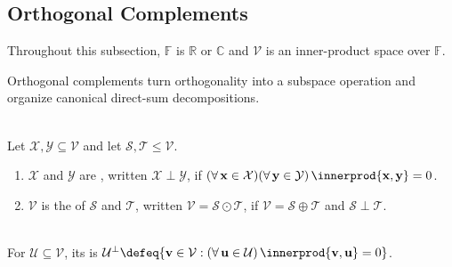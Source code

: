 \subsection{Orthogonal Complements}

%

Throughout this subsection, $\mathbb{F}$ is $\mathbb{R}$ or $\mathbb{C}$ and $\mathcal{V}$ is an inner-product space over $\mathbb{F}$.

Orthogonal complements turn orthogonality into a subspace operation and organize canonical direct-sum decompositions.

\begin{definition} \label{def:orthogonal-subsets-and-direct-sums} \\
Let $\mathcal{X},\mathcal{Y}\subseteq\mathcal{V}$ and let $\mathcal{S},\mathcal{T}\leq\mathcal{V}$.
\begin{enumerate}[label=(\roman*)]
\setlength{\itemsep}{0pt}
\item $\mathcal{X}$ and $\mathcal{Y}$ are , written $\mathcal{X}\perp\mathcal{Y}$, if $(\forall\,\mathbf{x}\in\mathcal{X})(\forall\,\mathbf{y}\in\mathcal{Y})\,\innerprod{\mathbf{x},\mathbf{y}}=0$.
\item $\mathcal{V}$ is the  of $\mathcal{S}$ and $\mathcal{T}$, written $\mathcal{V}=\mathcal{S}\odot\mathcal{T}$, if $\mathcal{V}=\mathcal{S}\oplus\mathcal{T}$ and $\mathcal{S}\perp\mathcal{T}$.
\end{enumerate}
\end{definition}

\begin{definition} \label{def:orthogonal-complement} \\
For $\mathcal{U}\subseteq\mathcal{V}$, its  is $\mathcal{U}^{\perp}\defeq\{\mathbf{v}\in\mathcal{V}:(\forall\,\mathbf{u}\in\mathcal{U})\,\innerprod{\mathbf{v},\mathbf{u}}=0\}$.
\end{definition}

